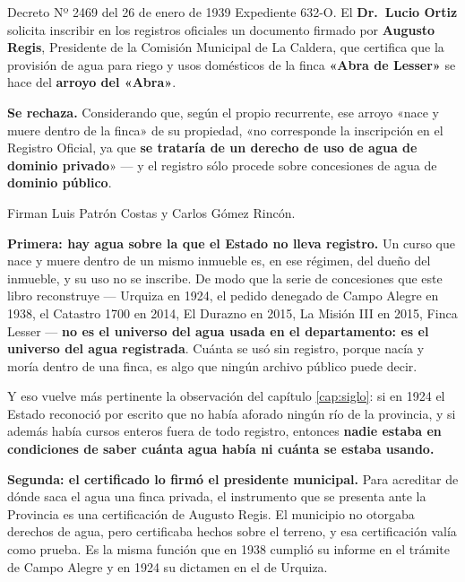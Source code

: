 \begin{ficha}{Decreto Nº 2469 del 26 de enero de 1939}
Expediente 632-O. El \textbf{Dr.\ Lucio Ortiz} solicita inscribir en los registros oficiales un
documento firmado por \textbf{Augusto Regis}, Presidente de la Comisión Municipal de La
Caldera, que certifica que la provisión de agua para riego y usos domésticos de la finca
\textbf{«Abra de Lesser»} se hace del \textbf{arroyo del «Abra»}.

\textbf{Se rechaza.} Considerando que, según el propio recurrente, ese arroyo «nace y muere
dentro de la finca» de su propiedad, «no corresponde la inscripción en el Registro Oficial,
ya que \textbf{se trataría de un derecho de uso de agua de dominio privado}» --- y el registro
sólo procede sobre concesiones de agua de \textbf{dominio público}.

Firman Luis Patrón Costas y Carlos Gómez Rincón.
\end{ficha}

\textbf{Primera: hay agua sobre la que el Estado no lleva registro.} Un curso que nace y muere
dentro de un mismo inmueble es, en ese régimen, del dueño del inmueble, y su uso no se
inscribe. De modo que la serie de concesiones que este libro reconstruye --- Urquiza en 1924,
el pedido denegado de Campo Alegre en 1938, el Catastro 1700 en 2014, El Durazno en 2015, La Misión III en 2015,
Finca Lesser --- \textbf{no es el universo del agua usada en el departamento: es el universo
del agua registrada}. Cuánta se usó sin registro, porque nacía y moría dentro de una finca,
es algo que ningún archivo público puede decir.

Y eso vuelve más pertinente la observación del capítulo \ref{cap:siglo}: si en 1924 el Estado reconoció por
escrito que no había aforado ningún río de la provincia, y si además había cursos enteros
fuera de todo registro, entonces \textbf{nadie estaba en condiciones de saber cuánta agua
había ni cuánta se estaba usando.}

\textbf{Segunda: el certificado lo firmó el presidente municipal.} Para acreditar de dónde saca
el agua una finca privada, el instrumento que se presenta ante la Provincia es una
certificación de Augusto Regis. El municipio no otorgaba derechos de agua, pero certificaba
hechos sobre el terreno, y esa certificación valía como prueba. Es la misma función que en
1938 cumplió su informe en el trámite de Campo Alegre y en 1924 su dictamen en el de Urquiza.

